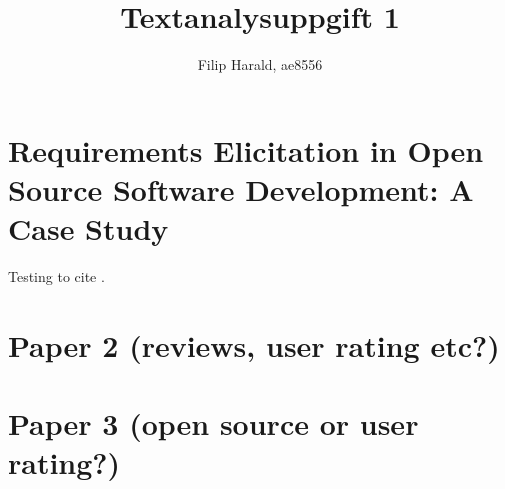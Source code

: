 \documentclass[11pt, oneside]{article}   	%
\title{Textanalysuppgift 1}
\author{Filip Harald, ae8556}
\begin{document}
\maketitle
\tableofcontents

\newpage
\section{Requirements Elicitation in Open Source Software
Development: A Case Study}
Testing to cite \cite{Noll2010}.

\newpage
\section{Paper 2 (reviews, user rating etc?)}

\newpage
\section{Paper 3 (open source or user rating?)}



\end{document}
